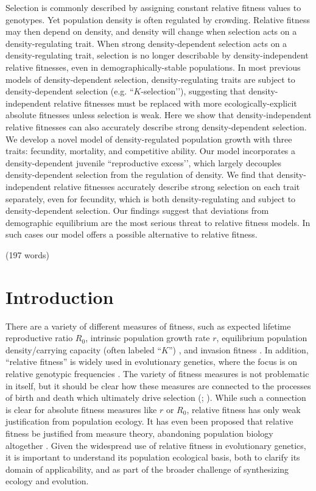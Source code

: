 \documentclass[12pt]{article}
\begin{document}
Selection is commonly described by assigning constant relative fitness values to genotypes. Yet population density is often regulated by crowding. Relative fitness may then depend on density, and density will change when selection acts on a density-regulating trait. When strong density-dependent selection acts on a density-regulating trait, selection is no longer describable by density-independent relative fitnesses, even in demographically-stable populations. In most previous models of density-dependent selection, density-regulating traits are subject to density-dependent selection (e.g. ``$K$-selection’’), suggesting that density-independent relative fitnesses must be replaced with more ecologically-explicit absolute fitnesses unless selection is weak. Here we show that density-independent relative fitnesses can also accurately describe strong density-dependent selection. We develop a novel model of density-regulated population growth with three traits: fecundity, mortality, and competitive ability. Our model incorporates a density-dependent juvenile ``reproductive excess’’, which largely decouples density-dependent selection from the regulation of density. We find that density-independent relative fitnesses accurately describe strong selection on each trait separately, even for fecundity, which is both density-regulating and subject to density-dependent selection. Our findings suggest that deviations from demographic equilibrium are the most serious threat to relative fitness models. In such cases our model offers a possible alternative to relative fitness. 

\noindent (197 words)

\newpage{}


\section*{Introduction}

There are a variety of different measures of fitness, such as expected lifetime reproductive ratio $R_0$, intrinsic population growth rate $r$, equilibrium population density/carrying capacity (often labeled ``$K$'') \citep{benton_2000}, and invasion fitness \citep{metz_1992}. In addition, ``relative fitness'' is widely used in evolutionary genetics, where the focus is on relative genotypic frequencies \cite[pp. 468]{barton_2007}. The variety of fitness measures is not problematic in itself, but it should be clear how these measures are connected to the processes of birth and death which ultimately drive selection (\citealt{metcalf_2007,doebeli_2017}; \citealt[pp. 178]{charlesworth_1994}). While such a connection is clear for absolute fitness measures like $r$ or $R_0$, relative fitness has only weak justification from population ecology. It has even been proposed that relative fitness be justified from measure theory, abandoning population biology altogether \citep{wagner_2010}. Given the widespread use of relative fitness in evolutionary genetics, it is important to understand its population ecological basis, both to clarify its domain of applicability, and as part of the broader challenge of synthesizing ecology and evolution.
\end{document}
